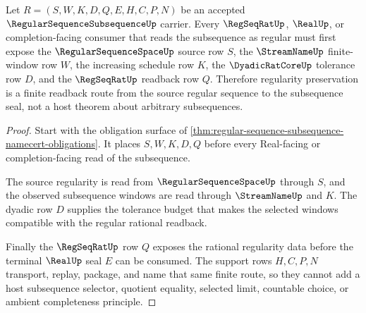 \begin{theorem}
\label{thm:regular-sequence-subsequence-regularity-preservation}
Let $R=(S,W,K,D,Q,E,H,C,P,N)$ be an accepted $\RegularSequenceSubsequenceUp$ carrier. Every $\RegSeqRatUp$, $\RealUp$, or completion-facing consumer that reads the subsequence as regular must first expose the $\RegularSequenceSpaceUp$ source row $S$, the $\StreamNameUp$ finite-window row $W$, the increasing schedule row $K$, the $\DyadicRatCoreUp$ tolerance row $D$, and the $\RegSeqRatUp$ readback row $Q$. Therefore regularity preservation is a finite readback route from the source regular sequence to the subsequence seal, not a host theorem about arbitrary subsequences.
\end{theorem}
\begin{proof}
Start with the obligation surface of \autoref{thm:regular-sequence-subsequence-namecert-obligations}. It places $S,W,K,D,Q$ before every Real-facing or completion-facing read of the subsequence.

The source regularity is read from $\RegularSequenceSpaceUp$ through $S$, and the observed subsequence windows are read through $\StreamNameUp$ and $K$. The dyadic row $D$ supplies the tolerance budget that makes the selected windows compatible with the regular rational readback.

Finally the $\RegSeqRatUp$ row $Q$ exposes the rational regularity data before the terminal $\RealUp$ seal $E$ can be consumed. The support rows $H,C,P,N$ transport, replay, package, and name that same finite route, so they cannot add a host subsequence selector, quotient equality, selected limit, countable choice, or ambient completeness principle.
\end{proof}


\begin{closurestatus}{\RegularSequenceSubsequenceUp}
  \theoryclosure{\seedClosure}
  \formalstatus{\unformalizedV}
\end{closurestatus}
